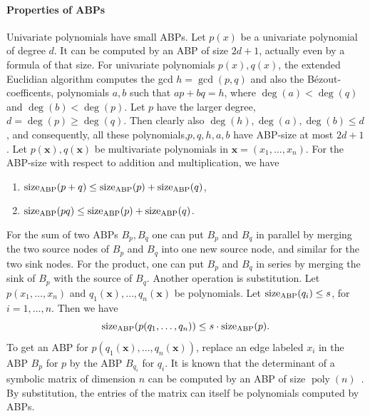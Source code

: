 \documentclass[10pt,a4paper]{article}
\newcommand{\sz}{\operatorname{size}_{\rm ABP}}
\begin{document}
\paragraph{Properties of ABPs}
Univariate polynomials have small ABPs. Let $p(x)$ be a univariate polynomial of degree $d$. It can be computed by an ABP of size $2d+1$, actually even by a formula of that size.
For univariate polynomials $p(x),q(x)$, the extended Euclidian algorithm computes the gcd $h=\gcd(p,q)$ and also the B\'ezout-coefficents, polynomials $a,b$ such that $ap+bq=h$, where $\deg(a)<\deg(q)$ and $\deg(b)<\deg(p)$. Let $p$ have the larger degree, $d=\deg(p)\geq\deg(q)$. Then clearly also $\deg(h),\deg(a),\deg(b)\leq d$, and consequently, all these polynomials,$p,q,h,a,b$ have ABP-size at most $2d+1$.
Let $p(\mathbf x),q(\mathbf x)$ be multivariate polynomials in $\mathbf x=(x_1,\ldots,x_n)$. For the ABP-size with respect to addition and multiplication, we have
\begin{enumerate}\item $\sz(p+q)\leq\sz(p)+\sz(q)$,\item $\sz(pq)\leq\sz(p)+\sz(q)$.\end{enumerate}
For the sum of two ABPs $B_p,B_q$ one can put $B_p$ and $B_q$ in parallel by merging the two source nodes of $B_p$ and $B_q$ into one new source node, and similar for the two sink nodes. For the product, one can put $B_p$ and $B_q$ in series by merging the sink of $B_p$ with the source of $B_q$.
Another operation is substitution. Let $p(x_1,\ldots,x_n)$ and $q_1(\mathbf x),\ldots,q_n(\mathbf x)$ be polynomials. Let $\sz(q_i)\leq s$, for $i=1,\ldots,n$. Then we have
\[\sz(p(q_1,\ldots,q_n))\leq s\cdot\sz(p).\]
To get an ABP for $p(q_1(\mathbf x),\ldots,q_n(\mathbf x))$, replace an edge labeled $x_i$ in the ABP $B_p$ for $p$ by the ABP $B_{q_i}$ for $q_i$.
It is known that the determinant of a symbolic matrix of dimension $n$ can be computed by an ABP of size $\operatorname{poly}(n)$~\cite{ref15}. By substitution, the entries of the matrix can itself be polynomials computed by ABPs.
\end{document}
